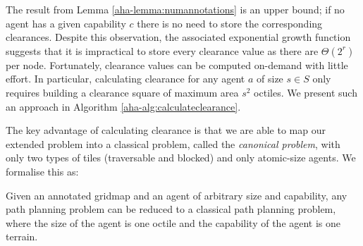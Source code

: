 The result from Lemma \ref{aha-lemma:numannotations} is an upper bound; if no agent has a given capability $c$ there is no need to store the corresponding clearances.
Despite this observation, the associated exponential growth function suggests that it is impractical to store every clearance value as there are $\Theta(2^{r})$ per node.
Fortunately, clearance values can be computed on-demand with little effort. 
In particular, calculating clearance for any agent $a$ of size $s \in S$ only requires building a clearance square of maximum area $s^2$ octiles. 
We present such an approach in Algorithm \ref{aha-alg:calculateclearance}. 

\par \indent
The key advantage of calculating clearance is that we are able to
map our extended problem into a classical problem, called the \emph{canonical problem}, with only two types of tiles (traversable and blocked) and only atomic-size agents. We formalise this as:
\begin{theorem}
\label{aha-theorem:reducibility}
Given an annotated gridmap and an agent of arbitrary size and capability, any path planning problem can be reduced to a classical path planning problem, where the size of the agent is one octile and the capability of the agent is one terrain.
\end{theorem}

